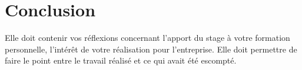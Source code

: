 \section*{Conclusion}
Elle doit contenir vos réflexions concernant l'apport du stage à votre formation personnelle, l'intérêt de votre réalisation pour l'entreprise. Elle doit permettre de faire le point entre le travail réalisé et ce qui avait été escompté.

\newpage
